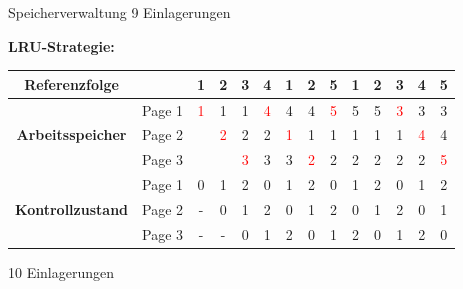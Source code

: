 \documentclass[german]{spicker}
\begin{document}
\begin{example}{Speicherverwaltung}
    9 Einlagerungen

    \textbf{LRU-Strategie:}

    \begin{tabular}{|c|c|c|c|c|c|c|c|c|c|c|c|c|c|}
        \hline
        \multicolumn{1}{|c}{\textbf{Referenzfolge}} & \multicolumn{1}{c|}{} & 1                  & 2                  & 3                  & 4                  & 1                  & 2                  & 5                  & 1 & 2 & 3                  & 4                  & 5                  \\
        \hline
        \hline
        \multirow{3}{*}{\textbf{Arbeitsspeicher}}   & Page 1                & \textcolor{red}{1} & 1                  & 1                  & \textcolor{red}{4} & 4                  & 4                  & \textcolor{red}{5} & 5 & 5 & \textcolor{red}{3} & 3                  & 3                  \\
                                                    & Page 2                &                    & \textcolor{red}{2} & 2                  & 2                  & \textcolor{red}{1} & 1                  & 1                  & 1 & 1 & 1                  & \textcolor{red}{4} & 4                  \\
                                                    & Page 3                &                    &                    & \textcolor{red}{3} & 3                  & 3                  & \textcolor{red}{2} & 2                  & 2 & 2 & 2                  & 2                  & \textcolor{red}{5} \\
        \hline
        \hline
        \multirow{3}{*}{\textbf{Kontrollzustand}}   & Page 1                & 0                  & 1                  & 2                  & 0                  & 1                  & 2                  & 0                  & 1 & 2 & 0                  & 1                  & 2                  \\
                                                    & Page 2                & -                  & 0                  & 1                  & 2                  & 0                  & 1                  & 2                  & 0 & 1 & 2                  & 0                  & 1                  \\
                                                    & Page 3                & -                  & -                  & 0                  & 1                  & 2                  & 0                  & 1                  & 2 & 0 & 1                  & 2                  & 0                  \\
        \hline
    \end{tabular}

    10 Einlagerungen
\end{example}
\end{document}
